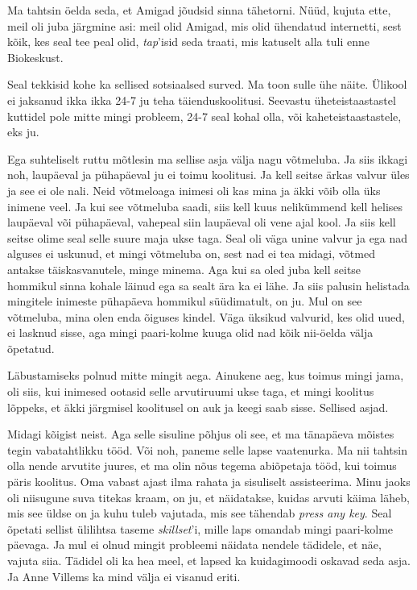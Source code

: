 Ma tahtsin öelda seda, et Amigad jõudsid sinna tähetorni. Nüüd, kujuta ette, 
meil oli juba järgmine asi: meil olid Amigad,  mis olid ühendatud  internetti, 
sest kõik, kes seal tee peal olid, \emph{tap}'isid seda traati, mis katuselt 
alla tuli enne Biokeskust. 


Seal tekkisid kohe ka sellised sotsiaalsed surved. Ma toon sulle ühe näite. 
Ülikool ei jaksanud ikka ikka 24-7 ju teha täienduskoolitusi. Seevastu 
üheteistaastastel kuttidel pole mitte mingi probleem, 24-7 seal kohal olla, või 
kaheteistaastastele, eks ju. 

Ega suhteliselt ruttu mõtlesin ma sellise asja välja nagu võtmeluba. Ja siis 
ikkagi noh, laupäeval ja pühapäeval ju ei toimu koolitusi. Ja kell seitse ärkas 
valvur üles ja see ei ole nali. Neid võtmeloaga inimesi oli kas mina ja äkki 
võib olla üks inimene veel. Ja kui see võtmeluba saadi, siis kell kuus 
nelikümmend  kell helises laupäeval või pühapäeval, vahepeal siin laupäeval oli 
vene ajal kool. Ja siis kell seitse olime seal selle suure maja ukse taga. Seal 
oli väga unine valvur ja ega nad alguses ei uskunud, et mingi võtmeluba on, 
sest nad ei tea midagi, võtmed antakse täiskasvanutele, minge minema. Aga kui 
sa oled juba kell seitse hommikul sinna kohale läinud ega sa sealt ära ka ei 
lähe. Ja siis palusin helistada mingitele inimeste pühapäeva hommikul 
süüdimatult, on ju. Mul on see võtmeluba, mina olen enda õiguses kindel. Väga 
üksikud valvurid, kes olid uued, ei lasknud sisse, aga mingi paari-kolme kuuga 
olid nad kõik nii-öelda välja õpetatud.


Läbustamiseks polnud mitte mingit aega. Ainukene aeg, kus toimus mingi jama, 
oli siis, kui inimesed ootasid selle arvutiruumi ukse taga, et mingi koolitus 
lõppeks, et äkki järgmisel koolitusel on auk ja keegi saab sisse. Sellised 
asjad.


Midagi kõigist neist. Aga selle sisuline põhjus oli see, et ma tänapäeva 
mõistes tegin vabatahtlikku tööd. Või noh, paneme selle  lapse vaatenurka. Ma 
nii tahtsin olla nende arvutite juures, et ma olin nõus tegema abiõpetaja tööd, 
kui toimus päris koolitus. Oma vabast ajast ilma rahata ja sisuliselt 
assisteerima. Minu jaoks oli niisugune suva titekas kraam, on ju, et  
näidatakse, kuidas  arvuti käima läheb, mis see üldse on ja kuhu tuleb 
vajutada, mis see tähendab \emph{press any key}. Seal õpetati sellist  
ülilihtsa taseme \emph{skillset}'i, mille laps omandab mingi paari-kolme 
päevaga. Ja mul ei olnud mingit probleemi näidata nendele tädidele, et näe, 
vajuta siia. Tädidel oli ka hea meel, et lapsed ka kuidagimoodi  oskavad seda 
asja. Ja Anne Villems ka mind välja ei visanud eriti. 

